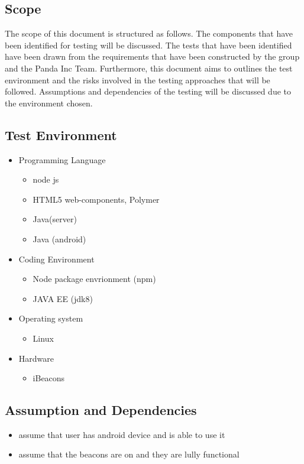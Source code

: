 \documentclass[11pt]{article}
\begin{document}
\subsection{Scope}
The scope of this document is structured as follows. The components that have been identified for testing will be discussed. The tests that have been identified have been drawn from the requirements that have been constructed by the group and the Panda Inc Team. Furthermore, this document aims to outlines the test environment and the risks involved in the testing approaches that will be followed. Assumptions and dependencies of the testing will be discussed due to the environment chosen.
\subsection{Test Environment}
\begin{itemize}
	\item Programming Language
	\begin{itemize}
		\item node js
		\item HTML5 web-components, Polymer
		\item Java(server)
		\item Java (android)
	\end{itemize}
	
	\item Coding Environment
	\begin{itemize}
		\item Node package envrionment (npm)\\
		\item JAVA EE (jdk8)
	\end{itemize}
	
	\item Operating system
	\begin{itemize}
		\item Linux
	\end{itemize}
	
	\item Hardware
	\begin{itemize}
		\item iBeacons
	\end{itemize}
\end{itemize}

\subsection{Assumption and Dependencies}
\begin{itemize}
	\item assume that user has android device and is able to use it
	\item assume that the beacons are on and they are lully functional
\end{itemize}
\end{document}
